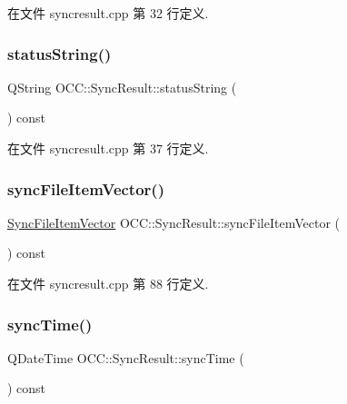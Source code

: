 在文件 syncresult.\+cpp 第 32 行定义.

\mbox{\label{class_o_c_c_1_1_sync_result_a73058225a9f5f6c831e72077631509b9}} 
\subsubsection{\texorpdfstring{status\+String()}{statusString()}}
{\footnotesize\ttfamily Q\+String O\+C\+C\+::\+Sync\+Result\+::status\+String (\begin{DoxyParamCaption}{ }\end{DoxyParamCaption}) const}



在文件 syncresult.\+cpp 第 37 行定义.

\mbox{\label{class_o_c_c_1_1_sync_result_a5dd6a09aa41ef38cbfcfb0e18e319408}} 
\subsubsection{\texorpdfstring{sync\+File\+Item\+Vector()}{syncFileItemVector()}}
{\footnotesize\ttfamily \hyperlink{namespace_o_c_c_af407f0fdf0476e0bfce478be3d0e441e}{Sync\+File\+Item\+Vector} O\+C\+C\+::\+Sync\+Result\+::sync\+File\+Item\+Vector (\begin{DoxyParamCaption}{ }\end{DoxyParamCaption}) const}



在文件 syncresult.\+cpp 第 88 行定义.

\mbox{\label{class_o_c_c_1_1_sync_result_aa709c5c0ff6ac930c634db25e8893a91}} 
\subsubsection{\texorpdfstring{sync\+Time()}{syncTime()}}
{\footnotesize\ttfamily Q\+Date\+Time O\+C\+C\+::\+Sync\+Result\+::sync\+Time (\begin{DoxyParamCaption}{ }\end{DoxyParamCaption}) const}



